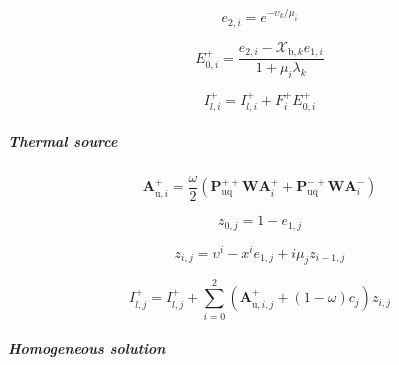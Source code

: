 \begin{equation}
e_{2,i} = e^{-\upsilon_{k} / \mu_{i}}
\label{eq:source_function_integration-local_source_classical-upward-forward-solar_source-e_2_i}
\end{equation}

\begin{equation}
E^{+}_{0,i} = \frac{e_{2,i} - \mathcal{X}_{\mathrm{b},k} e_{1,i}}{1 + \mu_{i} \lambda_{k}} 
\label{eq:source_function_integration-local_source_classical-upward-forward-solar_source-E_p_0_i}
\end{equation}

\begin{equation}
I^{+}_{l,i} = I^{+}_{l,i} + F^{+}_{i} E^{+}_{0,i}
\label{eq:source_function_integration-local_source_classical-upward-forward-solar_source-I_p_l_i_1}
\end{equation}


\subparagraph{Thermal source}
\label{sec:source_function_integration-local_source_classical-upward-forward-thermal_source}

\begin{equation}
\mathbf{A}^{+}_{\mathrm{u},i} = \frac{\omega}{2}(\mathbf{P}^{++}_{\mathrm{uq}}\mathbf{W}\mathbf{A}^{+}_{i} + \mathbf{P}^{-+}_{\mathrm{uq}}\mathbf{W}\mathbf{A}^{-}_{i})
\label{eq:source_function_integration-local_source_classical-upward-forward-thermal_source-A_p_u_i}
\end{equation}

\begin{equation}
z_{0,j} = 1 - e_{1,j}
\label{eq:source_function_integration-local_source_classical-upward-forward-thermal_source-series}
\end{equation}

\begin{equation}
z_{i,j} = \upsilon^{i} - x^{i} e_{1,j} + i \mu_{j} z_{i-1,j}
\label{eq:source_function_integration-local_source_classical-upward-forward-thermal_source-series}
\end{equation}

\begin{equation}
I^{+}_{l,j} = I^{+}_{l,j} + \sum^{2}_{i = 0} (\mathbf{A}^{+}_{\mathrm{u},i,j} + (1 - \omega) c_{j}) z_{i,j}
\label{eq:source_function_integration-local_source_classical-upward-forward-thermal_source-I_p_l_i_1}
\end{equation}


\subparagraph{Homogeneous solution}
\label{sec:source_function_integration-local_source_classical-upward-forward-homogeneous_solution}

